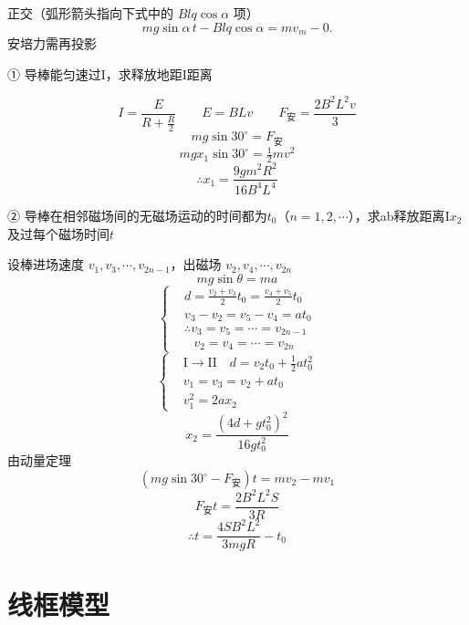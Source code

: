 \begin{problem}[4]

\begin{solution}
正交（弧形箭头指向下式中的 $Blq\cos\alpha$ 项）
\[
mg\sin\alpha\, t-Blq\cos\alpha=mv_m-0.
\]
安培力需再投影
\end{solution}
\end{problem}

\begin{problem}
① 导棒能匀速过$\mathrm{I}$，求释放地距$\mathrm{I}$距离 %
\begin{solution}
\[ I=\frac{E}{R+\frac{R}{2}}\qquad E=BLv\qquad F_{\text{安}}=\frac{2B^2L^2v}{3} \] %
\[ mg\sin30^\circ=F_{\text{安}} \]
\[ mgx_1\sin30^\circ=\tfrac12mv^2 \]
\[ \therefore x_1=\frac{9gm^2R^2}{16B^4L^4} \]
\end{solution}
② 导棒在相邻磁场间的无磁场运动的时间都为$t_0$（$n=1,2,\cdots$），求ab释放距离$\mathrm{I}$$x_2$及过每个磁场时间$t$
\begin{solution}
设棒进场速度 $v_1,v_3,\cdots,v_{2n-1}$，出磁场 $v_2,v_4,\cdots,v_{2n}$
\[ mg\sin\theta=ma \]
\[
\left\{\begin{aligned}
&d=\frac{v_2+v_3}{2}t_0=\frac{v_4+v_5}{2}t_0\\
&v_3-v_2=v_5-v_4=at_0\\
&\therefore v_3=v_5=\cdots=v_{2n-1}\\
&\phantom{\therefore\ }v_2=v_4=\cdots=v_{2n}
\end{aligned}\right.
\]
\[
\left\{\begin{aligned}
&\mathrm{I}\to\mathrm{II}\quad d=v_2t_0+\tfrac12at_0^2\\
&v_1=v_3=v_2+at_0\\
&v_1^2=2ax_2
\end{aligned}\right.
\]
\[ x_2=\frac{(4d+gt_0^2)^2}{16gt_0^2} \]
由动量定理
\[ (mg\sin30^\circ-F_{\text{安}})t=mv_2-mv_1 \]
\[ F_{\text{安}}t=\frac{2B^2L^2S}{3R} \]
\[ \therefore t=\frac{4SB^2L^2}{3mgR}-t_0 \]
\end{solution}
\end{problem}


\section{线框模型}
